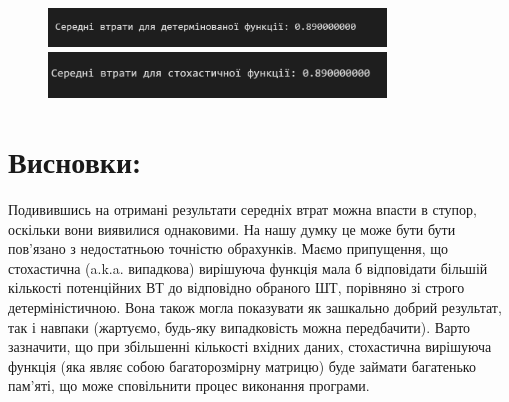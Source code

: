\begin{figure}[!ht]
        \centering
        \begin{minipage}{0.85\linewidth}
            \includegraphics[width=0.8\textwidth, scale=0.6]{ReportPic/report_7.1.png}
        \end{minipage}
        \begin{minipage}{0.85\linewidth}
            \includegraphics[width=0.8\textwidth, scale=0.5]{ReportPic/report_7.2.png}
        \end{minipage}
\end{figure}

\section{Висновки:}
Подивившись на отримані результати середніх втрат можна впасти в ступор, оскільки вони виявилися однаковими. На нашу думку це 
може бути бути пов'язано з недостатньою точністю обрахунків. Маємо припущення, що стохастична (a.k.a. випадкова) вирішуюча 
функція мала б відповідати більшій кількості потенційних ВТ до відповідно обраного ШТ, порівняно зі строго детерміністичною. 
Вона також могла показувати як зашкально добрий результат, так і навпаки (жартуємо, будь-яку випадковість можна передбачити). 
Варто зазначити, що при збільшенні кількості вхідних даних, стохастична вирішуюча функція (яка являє собою багаторозмірну 
матрицю) буде займати багатенько пам'яті, що може сповільнити процес виконання програми.